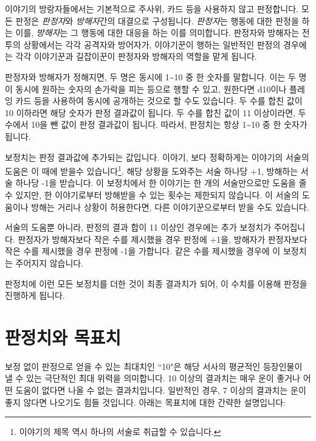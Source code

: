 \documentclass{report}
\begin{document}
	이야기의 방랑자들에서는 기본적으로 주사위, 카드 등을 사용하지 않고 판정합니다. 모든 판정은 \emph{판정자}와 \emph{방해자}간의 대결으로 구성됩니다. \emph{판정자}는 행동에 대한 판정을 하는 이를, \emph{방해자}는 그 행동에 대한 대응을 하는 이를 의미합니다. 판정자와 방해자는 전투의 상황에서는 각각 공격자와 방어자가, 이야기꾼이 행하는 일반적인 판정의 경우에는 각각 이야기꾼과 길잡이꾼이 판정자와 방해자의 역할을 맡게 됩니다.
	
	판정자와 방해자가 정해지면, 두 명은 동시에 1\textasciitilde10 중 한 숫자를 말합니다. 이는 두 명이 동시에 원하는 숫자의 손가락을 피는 등으로 행할 수 있고, 원한다면 d10이나 플레잉 카드 등을 사용하여 동시에 공개하는 것으로 할 수도 있습니다. 두 수를 합친 값이 10 이하라면 해당 숫자가 판정 결과값이 됩니다. 두 수를 합친 값이 11 이상이라면, 두 수에서 10을 뺀 값이 판정 결과값이 됩니다. 따라서, 판정치는 항상 1\textasciitilde10 중 한 숫자가 됩니다.
	
	보정치는 판정 결과값에 추가되는 값입니다. 이야기, 보다 정확하게는 이야기의 서술의 도움은 이 때에 받을수 있습니다\footnote{이야기의 제목 역시 하나의 서술로 취급할 수 있습니다.}. 해당 상황을 도와주는 서술 하나당 +1, 방해하는 서술 하나당 -1을 받습니다. 이 보정치에서 한 이야기는 한 개의 서술만으로만 도움을 줄 수 있지만, 한 이야기로부터 방해받을 수 있는 횟수는 제한되지 않습니다. 이 서술의 도움이나 방해는 거리나 상황이 허용한다면, 다른 이야기꾼으로부터 받을 수도 있습니다.
	
	서술의 도움뿐 아니라, 판정의 결과 합이 11 이상인 경우에는 추가 보정치가 주어집니다. 판정자가 방해자보다 작은 수를 제시했을 경우 판정에 +1을, 방해자가 판정자보다 작은 수를 제시했을 경우 판정에 -1을 가합니다. 같은 수를 제시했을 경우에 이 보정치는 주어지지 않습니다.
	
	판정치에 이런 모든 보정치를 더한 것이 최종 결과치가 되어, 이 수치를 이용해 판정을 진행하게 됩니다.
	
	\section*{판정치와 목표치}
	보정 없이 판정으로 얻을 수 있는 최대치인 ``10"은 해당 서사의 평균적인 등장인물이 낼 수 있는 극단적인 최대 위력을 의미합니다. 10 이상의 결과치는 매우 운이 좋거나 어떤 도움이 없다면 나올 수 없는 결과치입니다. 일반적인 경우, 7 이상의 결과치는 운이 좋지 않다면 나오기도 힘들 것입니다. 아래는 목표치에 대한 간략한 설명입니다:
	
\end{document}
